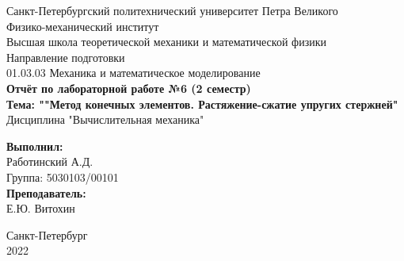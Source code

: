 \documentclass[12pt,a4paper]{article}
\begin{document}
	\begin{titlepage}
		
		\begin{center}	
			
			\large Санкт-Петербургский политехнический университет Петра Великого \\
			\large Физико-механический институт \\
			\large Высшая школа теоретической механики и математической физики \\[2cm] %
			
			\large Направление подготовки \\
			\large 01.03.03 Механика и математическое моделирование \\[4cm]
			
			
			\LARGE \textbf {Отчёт по лабораторной работе №6 (2 семестр)} \\[0.5cm] 
			\LARGE \textbf {Тема: ""Метод конечных элементов. Растяжение-сжатие упругих
				стержней"} \\[0.5cm]
			\large Дисциплина "Вычислительная механика" \\[4cm]
			
			
			
		\end{center}
		
		
		\begin{flushright} %
			\begin{minipage}{0.25\textwidth} %
				\begin{flushleft}
					
					\large\textbf{Выполнил:}\\
					\large Работинский А.Д. \\
					\large {Группа:} 5030103/00101 \\
					
					\large \textbf{Преподаватель:}\\
					\large Е.Ю. Витохин
					
				\end{flushleft}
			\end{minipage}
		\end{flushright}
		
		
		\begin{center}
			\large Санкт-Петербург \\
			\large 2022 
		\end{center} 
		
	\end{titlepage} 
	
\end{document}
